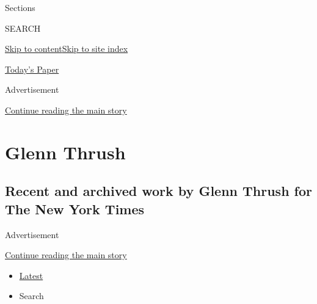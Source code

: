 Sections

SEARCH

\protect\hyperlink{site-content}{Skip to
content}\protect\hyperlink{site-index}{Skip to site index}

\href{https://myaccount.nytimes.com/auth/login?response_type=cookie\&client_id=vi}{}

\href{https://www.nytimes.com/section/todayspaper}{Today's Paper}

Advertisement

\protect\hyperlink{after-top}{Continue reading the main story}

\hypertarget{glenn-thrush}{%
\section{Glenn Thrush}\label{glenn-thrush}}

\hypertarget{recent-and-archived-work-by-glenn-thrush-for-the-new-york-times}{%
\subsection{Recent and archived work by Glenn Thrush for The New York
Times}\label{recent-and-archived-work-by-glenn-thrush-for-the-new-york-times}}

Advertisement

\protect\hyperlink{after-mid1}{Continue reading the main story}

\begin{itemize}
\tightlist
\item
  \protect\hyperlink{stream-panel}{Latest}
\item
  Search
\end{itemize}

